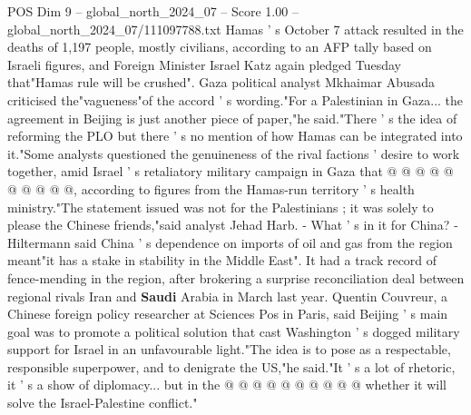 \begin{textsample}{POS Dim 9 – global\_north\_2024\_07 – Score 1.00 – global\_north\_2024\_07/111097788.txt}
Hamas ' s October 7 attack resulted in the deaths of 1,197 people, mostly civilians, according to an AFP tally based on Israeli figures, and Foreign Minister Israel Katz again pledged Tuesday that"Hamas rule will be crushed".
Gaza political analyst Mkhaimar Abusada criticised the"vagueness"of the accord ' s wording."For a Palestinian in Gaza... the agreement in Beijing is just another piece of paper,"he said."There ' s the idea of reforming the PLO but there ' s no mention of how Hamas can be integrated into it."Some analysts questioned the genuineness of the rival factions ' desire to work together, amid Israel ' s retaliatory military campaign in Gaza that @ @ @ @ @ @ @ @ @ @, according to figures from the Hamas-run territory ' s health ministry."The statement issued was not for the Palestinians ; it was solely to please the Chinese friends,"said analyst Jehad Harb. - What ' s in it for China? - Hiltermann said China ' s dependence on imports of oil and gas from the region meant"it has a stake in stability in the Middle East".
It had a track record of fence-mending in the region, after brokering a surprise reconciliation deal between regional rivals Iran and \textbf{Saudi} Arabia in March last year.
Quentin Couvreur, a Chinese foreign policy researcher at Sciences Pos in Paris, said Beijing ' s main goal was to promote a political solution that cast Washington ' s dogged military support for Israel in an unfavourable light."The idea is to pose as a respectable, responsible superpower, and to denigrate the US,"he said."It ' s a lot of rhetoric, it ' s a show of diplomacy... but in the @ @ @ @ @ @ @ @ @ @ whether it will solve the Israel-Palestine conflict."

\end{textsample}
